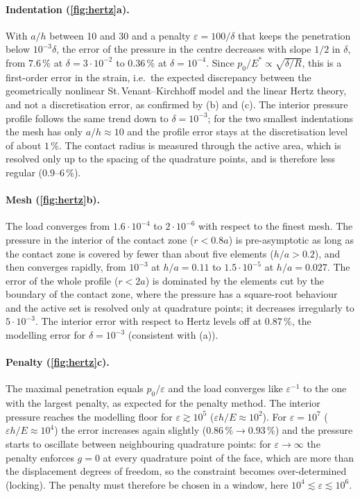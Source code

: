 \documentclass[11pt,a4paper]{article}
\begin{document}
\paragraph{Indentation (\cref{fig:hertz}a).}
With $a/h$ between 10 and 30 and a penalty $\varepsilon=100/\delta$ that keeps the penetration
below $10^{-3}\delta$, the error of the pressure in the centre decreases with slope $1/2$ in
$\delta$, from $7.6\,\%$ at $\delta=3\cdot10^{-2}$ to $0.36\,\%$ at $\delta=10^{-4}$. Since
$p_0/E^* \propto \sqrt{\delta/R}$, this is a first-order error in the strain, i.e.\ the expected
discrepancy between the geometrically nonlinear St.\,Venant--Kirchhoff model and the linear Hertz
theory, and not a discretisation error, as confirmed by (b) and (c). The interior pressure profile
follows the same trend down to $\delta = 10^{-3}$; for the two smallest indentations the mesh has
only $a/h\approx 10$ and the profile error stays at the discretisation level of about $1\,\%$. The
contact radius is measured through the active area, which is resolved only up to the spacing of
the quadrature points, and is therefore less regular ($0.9$--$6\,\%$).

\paragraph{Mesh (\cref{fig:hertz}b).}
The load converges from $1.6\cdot10^{-4}$ to $2\cdot10^{-6}$ with respect to the finest mesh. The
pressure in the interior of the contact zone ($r<0.8a$) is pre-asymptotic as long as the contact
zone is covered by fewer than about five elements ($h/a>0.2$), and then converges rapidly, from
$10^{-3}$ at $h/a=0.11$ to $1.5\cdot10^{-5}$ at $h/a=0.027$. The error of the whole profile
($r<2a$) is dominated by the elements cut by the boundary of the contact zone, where the pressure
has a square-root behaviour and the active set is resolved only at quadrature points; it
decreases irregularly to $5\cdot10^{-3}$. The interior error with respect to Hertz levels off at
$0.87\,\%$, the modelling error for $\delta=10^{-3}$ (consistent with (a)).

\paragraph{Penalty (\cref{fig:hertz}c).}\label{sec:penalty-remark}
The maximal penetration equals $p_0/\varepsilon$ and the load converges like $\varepsilon^{-1}$
to the one with the largest penalty, as expected for the penalty method. The interior pressure
reaches the modelling floor for $\varepsilon\gtrsim10^5$ ($\varepsilon h/E\approx 10^2$). For
$\varepsilon=10^7$ ($\varepsilon h/E\approx 10^4$) the error increases again slightly
($0.86\,\%\to0.93\,\%$) and the pressure starts to oscillate between neighbouring quadrature points:
for $\varepsilon\to\infty$ the penalty enforces $g=0$ at every quadrature point of the face, which
are more than the displacement degrees of freedom, so the constraint becomes over-determined
(locking). The penalty must therefore be chosen in a window, here
$10^4\lesssim\varepsilon\lesssim10^6$.
\end{document}
